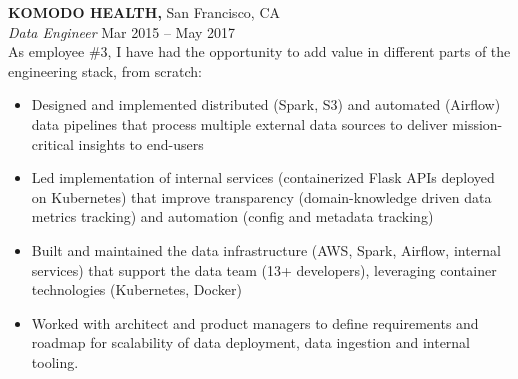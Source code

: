 \documentclass[geomargin]{res}
\begin{document}
\begin{resume}
\begin{itemize}
\end{itemize}
\vspace{-1mm}

{\bf KOMODO HEALTH,} San Francisco, CA \\
{\em Data Engineer} \hfill
Mar 2015 -- May 2017 \\
As employee \#3, I have had the opportunity to add value in different parts of the engineering stack, from scratch: \\                                          \vspace{-4mm}

\begin{itemize}                                         \itemsep1pt %
  \item Designed and implemented distributed (Spark, S3) and automated (Airflow) data pipelines that process multiple external data sources to deliver mission-critical insights to end-users

  \item Led implementation of internal services (containerized Flask APIs deployed on Kubernetes) that improve transparency (domain-knowledge driven data metrics tracking) and automation (config and metadata tracking)

  \item Built and maintained the data infrastructure (AWS, Spark, Airflow, internal services) that support the data team (13+ developers), leveraging container technologies (Kubernetes, Docker)

  \item Worked with architect and product managers to define requirements and roadmap for scalability of data deployment, data ingestion and internal tooling.

\end{itemize}
\vspace{-1mm}



\end{resume}
\end{document}
